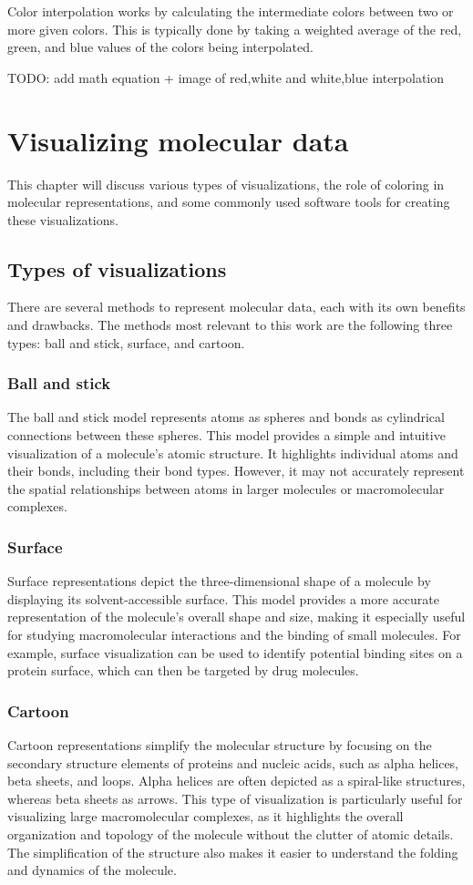 \documentclass[
  digital,     %
  oneside,     %
  nosansbold,  %
  nocolorbold, %
  lof,         %
  lot,         %
]{fithesis4}
\begin{document}
Color interpolation works by calculating the intermediate colors between two or more given colors. This is typically done by taking a weighted average of the red, green, and blue values of the colors being interpolated.

TODO: add math equation + image of red,white and white,blue interpolation

\chapter{Visualizing molecular data}
This chapter will discuss various types of visualizations, the role of coloring in molecular representations, and some commonly used software tools for creating these visualizations.

\section{Types of visualizations}
There are several methods to represent molecular data, each with its own benefits and drawbacks. The methods most relevant to this work are the following three types: ball and stick, surface, and cartoon.

\subsection{Ball and stick}
The ball and stick model represents atoms as spheres and bonds as cylindrical connections between these spheres. This model provides a simple and intuitive visualization of a molecule's atomic structure. It highlights individual atoms and their bonds, including their bond types. However, it may not accurately represent the spatial relationships between atoms in larger molecules or macromolecular complexes.

\subsection{Surface}
Surface representations depict the three-dimensional shape of a molecule by displaying its solvent-accessible surface.
This model provides a more accurate representation of the molecule's overall shape and size, making it especially useful for studying macromolecular interactions and the binding of small molecules.
For example, surface visualization can be used to identify potential binding sites on a protein surface, which can then be targeted by drug molecules.

\subsection{Cartoon}
Cartoon representations simplify the molecular structure by focusing on the secondary structure elements of proteins and nucleic acids, such as alpha helices, beta sheets, and loops. Alpha helices are often depicted as a spiral-like structures, whereas beta sheets as arrows. This type of visualization is particularly useful for visualizing large macromolecular complexes, as it highlights the overall organization and topology of the molecule without the clutter of atomic details. The simplification of the structure also makes it easier to understand the folding and dynamics of the molecule.
\end{document}
